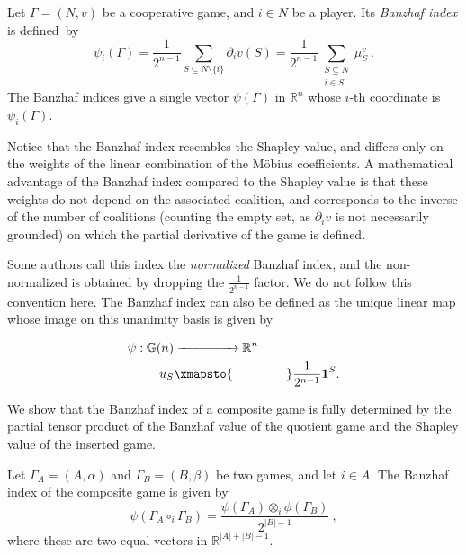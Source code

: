 \documentclass[a4paper,12pt]{amsart}
\begin{document}
\begin{definition}
    Let \(\Gamma = (N, v)\) be a cooperative game, and \(i \in N\) be a player. Its \emph{Banzhaf index} is defined~by 
    \[
    \psi_i(\Gamma) = \frac{1}{2^{n-1}} \sum_{S \subseteq N \setminus \{i\}} \partial_i v(S) = \frac{1}{2^{n-1}} \sum_{\substack{S \subseteq N \\ i \in S}} \mu^v_S~. 
    \]
    The Banzhaf indices give a single vector $\psi(\Gamma)$ in $\mathbb{R}^n$ whose $i$-th coordinate is $\psi_i(\Gamma)$. 
\end{definition}

Notice that the Banzhaf index resembles the Shapley value, and differs only on the weights of the linear combination of the M{\"o}bius coefficients. A mathematical advantage of the Banzhaf index compared to the Shapley value is that these weights do not depend on the associated coalition, and corresponds to the inverse of the number of coalitions (counting the empty set, as \(\partial_i v\) is not necessarily grounded) on which the partial derivative of the game is defined. 

\medskip 

Some authors call this index the \emph{normalized} Banzhaf index, and the non-normalized is obtained by dropping the \(\frac{1}{2^{n-1}}\) factor. We do not follow this convention here. The Banzhaf index can also be defined as the unique linear map whose image on this unanimity basis is given by 

\[ \begin{aligned} 
\psi: \mathbb{G}(n) & \xrightarrow{\hspace{1.5cm}} \mathbb{R}^n \\
u_S & \xmapsto{\hspace{1.5cm}} \frac{1}{2^{n-1}} \mathbf{1}^S. 
\end{aligned} 
\]
\vspace{0.1pc}

We show that the Banzhaf index of a composite game is fully determined by the partial tensor product of the Banzhaf value of the quotient game and the Shapley value of the inserted game.

\begin{theorem}\label{thm: Banzhaf value of a composite game}
    Let \(\Gamma_A = (A, \alpha)\) and \(\Gamma_B = (B, \beta)\) be two games, and let \(i \in A\). The Banzhaf index of the composite game is given by 
    \[
    \psi \left(\Gamma_A \circ_i \Gamma_B \right) = \frac{\psi(\Gamma_A) \otimes_i \phi(\Gamma_B)}{2^{\lvert B \rvert - 1}} ~,
    \]
    where these are two equal vectors in $\mathbb{R}^{\lvert A \rvert + \lvert B \rvert -1}$.
\end{theorem}
\end{document}
